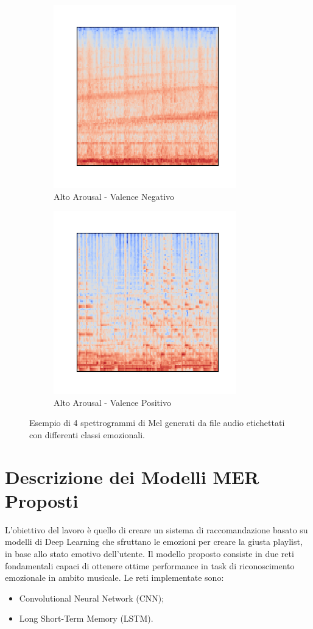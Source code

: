 \documentclass[11pt]{report}
\begin{document}
\begin{figure}
		\begin{subfigure}[t]{.45\textwidth}
         \centering
         \includegraphics[scale = 0.8]{img/Mel-2.png}
         \caption{Alto Arousal - Valence Negativo}
	\end{subfigure}
	\quad
	\begin{subfigure}[t]{.45\textwidth}
		\centering
        \includegraphics[scale = 0.8]{img/Mel-3.png}
        \caption{Alto Arousal - Valence Positivo}
	\end{subfigure}
	\caption{Esempio di 4 spettrogrammi di Mel generati da file audio etichettati con differenti classi emozionali.}
	\label{fig-spectrogram}
\end{figure}



\chapter{Descrizione dei Modelli MER Proposti}

L'obiettivo del lavoro è quello di creare un sistema di raccomandazione basato su modelli di Deep Learning che sfruttano le emozioni per creare la giusta playlist, in base allo stato emotivo dell'utente. Il modello proposto consiste in due reti fondamentali capaci di ottenere ottime performance in task di riconoscimento emozionale in ambito musicale. Le reti implementate sono:
\begin{itemize}
    \item Convolutional Neural Network (CNN);
    \item Long Short-Term Memory (LSTM).
\end{itemize}
\end{document}
